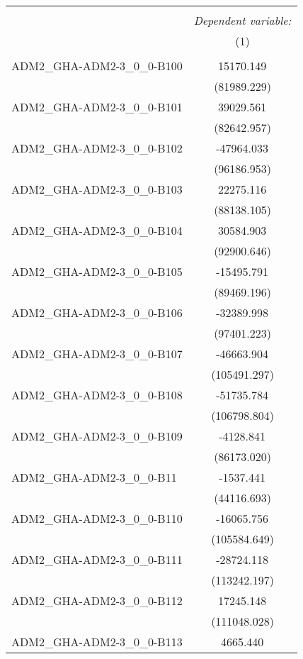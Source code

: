 \begin{table}[!htbp] \centering
\begin{tabular}{@{\extracolsep{5pt}}lc}
\\[-1.8ex]\hline
\hline \\[-1.8ex]
& \multicolumn{1}{c}{\textit{Dependent variable:}} \
\cr \cline{1-2}
\\[-1.8ex] & (1) \\
\hline \\[-1.8ex]
 ADM2_GHA-ADM2-3_0_0-B100 & 15170.149$^{}$ \\
  & (81989.229) \\
 ADM2_GHA-ADM2-3_0_0-B101 & 39029.561$^{}$ \\
  & (82642.957) \\
 ADM2_GHA-ADM2-3_0_0-B102 & -47964.033$^{}$ \\
  & (96186.953) \\
 ADM2_GHA-ADM2-3_0_0-B103 & 22275.116$^{}$ \\
  & (88138.105) \\
 ADM2_GHA-ADM2-3_0_0-B104 & 30584.903$^{}$ \\
  & (92900.646) \\
 ADM2_GHA-ADM2-3_0_0-B105 & -15495.791$^{}$ \\
  & (89469.196) \\
 ADM2_GHA-ADM2-3_0_0-B106 & -32389.998$^{}$ \\
  & (97401.223) \\
 ADM2_GHA-ADM2-3_0_0-B107 & -46663.904$^{}$ \\
  & (105491.297) \\
 ADM2_GHA-ADM2-3_0_0-B108 & -51735.784$^{}$ \\
  & (106798.804) \\
 ADM2_GHA-ADM2-3_0_0-B109 & -4128.841$^{}$ \\
  & (86173.020) \\
 ADM2_GHA-ADM2-3_0_0-B11 & -1537.441$^{}$ \\
  & (44116.693) \\
 ADM2_GHA-ADM2-3_0_0-B110 & -16065.756$^{}$ \\
  & (105584.649) \\
 ADM2_GHA-ADM2-3_0_0-B111 & -28724.118$^{}$ \\
  & (113242.197) \\
 ADM2_GHA-ADM2-3_0_0-B112 & 17245.148$^{}$ \\
  & (111048.028) \\
 ADM2_GHA-ADM2-3_0_0-B113 & 4665.440$^{}$ \\

\end{tabular}
\end{table}
